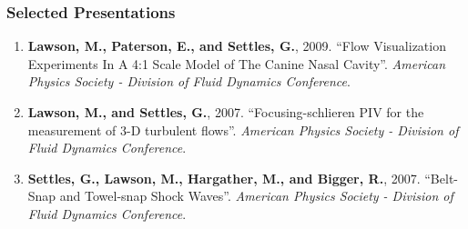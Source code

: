 \subsubsection*{Selected Presentations}
\vspace{-0.15in}

\begin{enumerate}[leftmargin=1.5pc,itemsep=0pt,parsep=0pt,topsep=0pt,partopsep=1pt]

\item \textbf{Lawson, M., Paterson, E., and Settles, G.}, 2009. ``Flow Visualization Experiments In A 4:1 Scale Model of The Canine Nasal Cavity''. \emph{American Physics Society - Division of Fluid Dynamics Conference}.

\item \textbf{Lawson, M., and Settles, G.}, 2007. ``Focusing-schlieren PIV for the measurement of 3-D turbulent flows''. \emph{American Physics Society - Division of Fluid Dynamics Conference}.

\item \textbf{Settles, G., Lawson, M., Hargather, M., and Bigger, R.}, 2007. ``Belt-Snap and Towel-snap Shock Waves''. \emph{American Physics Society - Division of Fluid Dynamics Conference}.

\end{enumerate}

